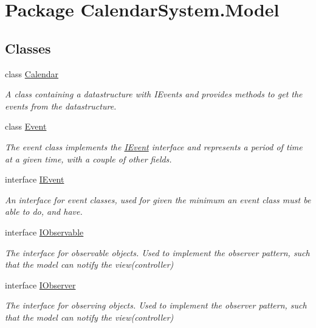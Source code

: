 \hypertarget{namespace_calendar_system_1_1_model}{\section{Package Calendar\+System.\+Model}
\label{namespace_calendar_system_1_1_model}
}
\subsection*{Classes}
\begin{DoxyCompactItemize}
\item 
class \hyperlink{class_calendar_system_1_1_model_1_1_calendar}{Calendar}
\begin{DoxyCompactList}\small\item\em A class containing a datastructure with I\+Events and provides methods to get the events from the datastructure. \end{DoxyCompactList}\item 
class \hyperlink{class_calendar_system_1_1_model_1_1_event}{Event}
\begin{DoxyCompactList}\small\item\em The event class implements the \hyperlink{interface_calendar_system_1_1_model_1_1_i_event}{I\+Event} interface and represents a period of time at a given time, with a couple of other fields. \end{DoxyCompactList}\item 
interface \hyperlink{interface_calendar_system_1_1_model_1_1_i_event}{I\+Event}
\begin{DoxyCompactList}\small\item\em An interface for event classes, used for given the minimum an event class must be able to do, and have. \end{DoxyCompactList}\item 
interface \hyperlink{interface_calendar_system_1_1_model_1_1_i_observable}{I\+Observable}
\begin{DoxyCompactList}\small\item\em The interface for observable objects. Used to implement the observer pattern, such that the model can notify the view(controller) \end{DoxyCompactList}\item 
interface \hyperlink{interface_calendar_system_1_1_model_1_1_i_observer}{I\+Observer}
\begin{DoxyCompactList}\small\item\em The interface for observing objects. Used to implement the observer pattern, such that the model can notify the view(controller) \end{DoxyCompactList}\item 

\end{DoxyCompactItemize}
